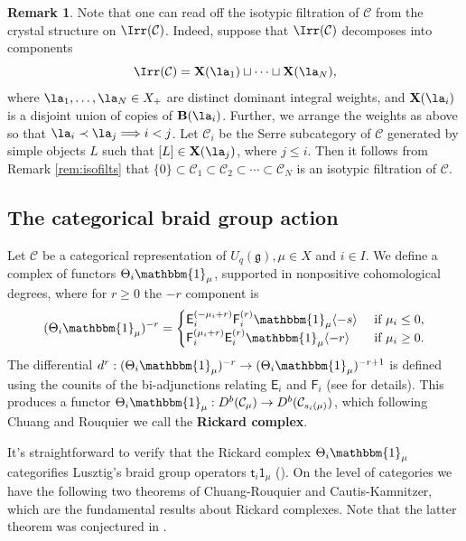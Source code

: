 \documentclass[11pt,reqno]{amsart}
\numberwithin{equation}{section}
\theoremstyle{definition}
\newtheorem{Remark}[equation]{Remark}
\theoremstyle{named}
\newcommand{\bB}{\mathbf{B}}
\newcommand{\cC}{\mathcal{C}}
\newcommand{\sE}{\mathsf{E}}
\newcommand{\sF}{\mathsf{F}}
\newcommand{\bX}{\mathbf{X}}
\newcommand{\fg}{\mathfrak{g}}
\newcommand{\st}{\mathsf{t}}
\newcommand{\bone}{\mathbbm{1}}
\newcommand{\sone}{\mathsf{1}}
\begin{document}
\begin{Remark}\label{rem:JHfromCrystal}
Note that one can read off the isotypic filtration of $\cC$  from the crystal structure on $\Irr(\cC)$.  Indeed, suppose that $\Irr(\cC)$ decomposes into  components 
$$
\Irr(\cC)=\bX(\la_1) \sqcup \cdots \sqcup \bX(\la_N),
$$
where $\la_1,\hdots,\la_N \in X_+$ are distinct dominant integral weights, and $\bX(\la_i)$ is a disjoint union of copies of $\bB(\la_i)$.  Further, we arrange the weights  as above so that  $\la_i \prec \la_j \Longrightarrow i < j$.  Let $\cC_i$ be the Serre subcategory of $\cC$ generated by simple objects $L$ such that $[L] \in \bX(\la_j)$, where $j \leq i$.  Then it follows from Remark \ref{rem:isofilts} that $\{0\} \subset \cC_1 \subset \cC_2 \subset \cdots \subset \cC_N$ is an isotypic filtration of $\cC$.
\end{Remark}

\subsection{The categorical braid group action}
Let $\cC$ be a categorical representation of $U_q(\fg), \mu \in X$ and $i\in I$.     
We define a complex of functors $\Theta_i\bone_\mu$, supported in nonpositive cohomological degrees, where for $r\geq0$ the $-r$ component is
\begin{align*}
(\Theta_i\bone_\mu)^{-r}=\begin{cases}\sE_i^{(-\mu_i+r)}\sF_i^{(r)}\bone_\mu\langle -s \rangle &\text{ if } \mu_i\leq0, \\
\sF_i^{(\mu_i+r)}\sE_i^{(r)}\bone_\mu\langle -r \rangle &\text{ if } \mu_i\geq0.
\end{cases}
\end{align*}
The differential $d^r:(\Theta_i\bone_\mu)^{-r} \to (\Theta_i\bone_\mu)^{-r+1}$ is defined using the counits of the bi-adjunctions relating $\sE_i$ and $\sF_i$ (see \cite[Section 4]{Cauclasp} for details).  This produces a functor $\Theta_i\bone_\mu:D^b(\cC_\mu)\to D^b(\cC_{s_i(\mu)})$, which following Chuang and Rouquier we call the \textbf{Rickard complex}.


It's straightforward to verify that the Rickard complex $\Theta_i\bone_\mu$ categorifies Lusztig's braid group operators $\st_i\sone_\mu$ (\cite[Section 2]{Cauclasp}).
On the level of categories we have the following two theorems of Chuang-Rouquier and Cautis-Kamnitzer, which are the fundamental results about  Rickard complexes.  Note that the latter theorem was conjectured in \cite[Conjecture 5.19]{Rou2KM}.
\end{document}
